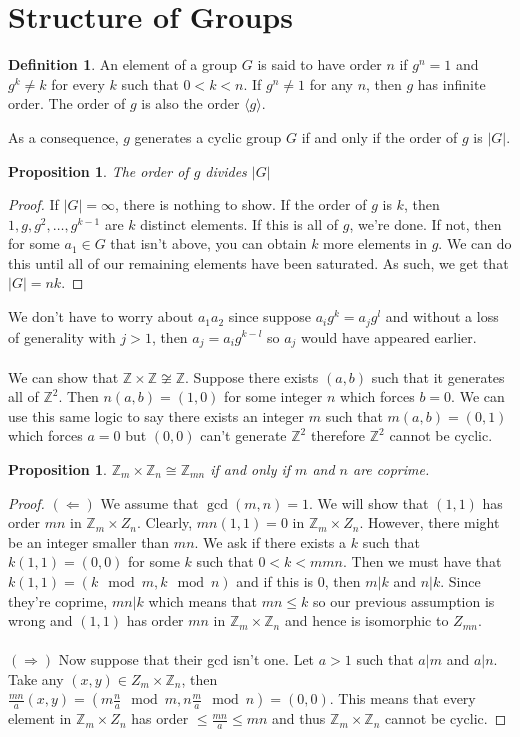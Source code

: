 \documentclass{article}
\newcommand{\Z}{\mathbb{Z}}
\newtheorem{proposition}[theorem]{Proposition}
\theoremstyle{definition}
\newtheorem{definition}[theorem]{Definition}
\begin{document}
\section{Structure of Groups}
\begin{definition}
    An element of a group $G$ is said to have order $n$ if $g^n=1$ and $g^k \neq k$ for every $k$ such that $0<k<n$. If $g^n\neq 1$ for any $n$, then $g$ has infinite order. The order of $g$ is also the order $\langle g \rangle$. 
\end{definition}
As a consequence, $g$ generates a cyclic group $G$ if and only if the order of $g$ is $|G|$. 
\begin{proposition}
    The order of $g$ divides $|G|$
\end{proposition}
\begin{proof}
    If $|G|=\infty$, there is nothing to show. If the order of $g$ is $k$, then $1,g,g^2,\ldots, g^{k-1}$ are $k$ distinct elements. If this is all of $g$, we're done. If not, then for some $a_1 \in G$ that isn't above, you can obtain $k$ more elements in $g$. We can do this until all of our remaining elements have been saturated. As such, we get that $|G|=nk$.
\end{proof}
We don't have to worry about $a_1 a_2$ since suppose $a_ig^k = a_jg^l$ and without a loss of generality with $j>1$, then $a_j = a_ig^{k-l}$ so $a_j$ would have appeared earlier.\\\\
We can show that $\Z \times \Z \not\cong \Z$. Suppose there exists $(a,b)$ such that it generates all of $\Z^2$. Then $n(a,b)=(1,0)$ for some integer $n$ which forces $b=0$. We can use this same logic to say there exists an integer $m$ such that $m(a,b)=(0,1)$ which forces $a=0$ but $(0,0)$ can't generate $\Z^2$ therefore $\Z^2 $ cannot be cyclic. 
\begin{proposition}
    $\Z_m \times \Z_n \cong \Z_{mn}$ if and only if $m$ and $n$ are coprime.
\end{proposition}
\begin{proof}
    $(\Leftarrow)$ We assume that $\gcd(m,n)=1$. We will show that $(1,1)$ has order $mn$ in $\Z_m\times Z_n$. Clearly, $mn(1,1)=0$ in $\Z_m\times Z_n$. However, there might be an integer smaller than $mn$. We ask if there exists a $k$ such that $k(1,1)=(0,0)$ for some $k$ such that $0<k<mmn$. Then we must have that $k(1,1)=(k\mod m, k\mod n)$ and if this is $0$, then $m|k$ and $n|k$. Since they're coprime, $mn|k$ which means that $mn\leq k$ so our previous assumption is wrong and $(1,1)$ has order $mn$ in $\Z_m\times \Z_n$ and hence is isomorphic to $Z_{mn}$. \\\\
    $(\Rightarrow)$ Now suppose that their gcd isn't one. Let $a>1$ such that $a|m$ and $a|n$. Take any $(x,y)\in Z_m \times \Z_n$, then $\frac{mn}{a} (x,y)= (m\frac{n}{a}\mod m, n\frac{m}{a}\mod n) = (0,0)$. This means that every element in $\Z_m \times Z_n$ has order $\leq \frac{mn}{a} \leq mn$ and thus $\Z_m \times \Z_n$ cannot be cyclic.
\end{proof}
\end{document}
